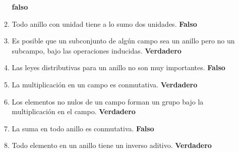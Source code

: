 \begin{enumerate}
\begin{enumerate}
		\textbf{falso}
		\item Todo anillo con unidad tiene a lo sumo dos unidades.
		\textbf{Falso}
		\item Es posible que un subconjunto de algún campo sea un anillo pero no un subcampo, bajo las operaciones inducidas.
		\textbf{Verdadero}
		\item Las leyes distributivas para un anillo no son muy importantes.
		\textbf{Falso}
		\item La multiplicación en un campo es conmutativa.
		\textbf{Verdadero}
		\item Los elementos no nulos de un campo forman un grupo bajo la multiplicación en el campo.
		\textbf{Verdadero}
		\item La suma en todo anillo es conmutativa.
		\textbf{Falso}
		\item Todo elemento en un anillo tiene un inverso aditivo.
		\textbf{Verdadero}
	\end{enumerate}
\end{enumerate}

